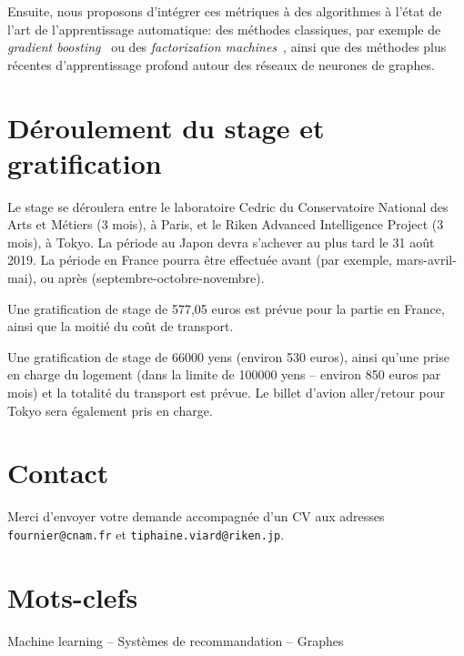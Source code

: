 \documentclass[a4paper, 12pt]{article}
\begin{document}
Ensuite, nous proposons d'intégrer ces métriques à des algorithmes à l'état de l'art de l'apprentissage automatique: des méthodes classiques, par exemple de {\em gradient boosting}~\cite{} ou des {\em factorization machines}~\cite{}, ainsi que des méthodes plus récentes d'apprentissage profond autour des réseaux de neurones de graphes.


\section*{Déroulement du stage et gratification}

Le stage se déroulera entre le laboratoire Cedric du Conservatoire National des Arts et Métiers (3 mois), à Paris, et le Riken Advanced Intelligence Project (3 mois), à Tokyo. La période au Japon devra s'achever au plus tard le 31 août 2019. La période en France pourra être effectuée avant (par exemple, mars-avril-mai), ou après (septembre-octobre-novembre).

Une gratification de stage de 577,05 euros est prévue pour la partie en France, ainsi que la moitié du coût de transport.

Une gratification de stage de 66000 yens (environ 530 euros), ainsi qu'une prise en charge du logement (dans la limite de 100000 yens -- environ 850 euros par mois) et la totalité du transport est prévue. Le billet d'avion aller/retour pour Tokyo sera également pris en charge.

\section*{Contact}

Merci d'envoyer votre demande accompagnée d'un CV aux adresses \texttt{fournier@cnam.fr} et \texttt{tiphaine.viard@riken.jp}. 

\section*{Mots-clefs}

Machine learning -- Systèmes de recommandation -- Graphes

\vfill



\vfill
\end{document}
